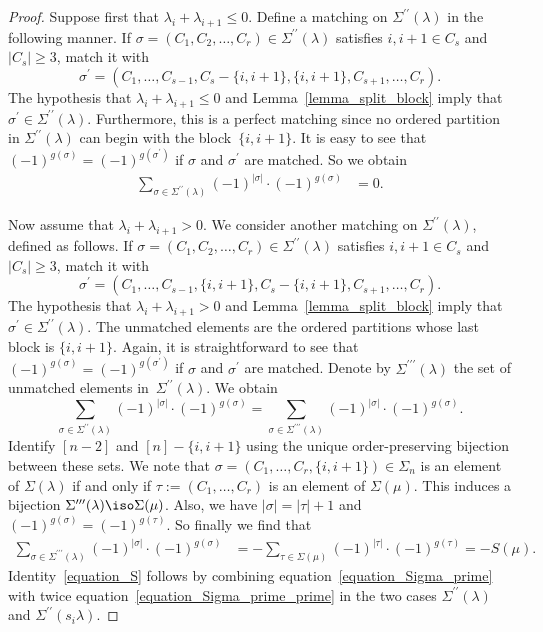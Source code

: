 \begin{proof}
Suppose first that $\lambda_{i}+\lambda_{i+1}\leq 0$.
Define a matching on $\Sigma^{\prime\prime}(\lambda)$ in the following manner.
If $\sigma=(C_{1},C_{2},\ldots,C_{r}) \in \Sigma^{\prime\prime}(\lambda)$
satisfies
$i, i+1 \in C_{s}$ and $|C_{s}|\geq 3$, match it with
$$ \sigma^{\prime}
=
(C_{1},\ldots,C_{s-1},C_{s}-\{i,i+1\},\{i,i+1\},C_{s+1},\ldots,C_{r}) . $$
The hypothesis that $\lambda_{i}+\lambda_{i+1} \leq 0$
and Lemma~\ref{lemma_split_block}
imply that 
$\sigma^{\prime} \in \Sigma^{\prime\prime}(\lambda)$.
Furthermore, this is a perfect matching
since no ordered partition 
in $\Sigma^{\prime\prime}(\lambda)$
can begin with the block~$\{i,i+1\}$.
It is easy to see that 
$(-1)^{g(\sigma)}=(-1)^{g(\sigma^{\prime})}$ if $\sigma$ and $\sigma^{\prime}$ are matched.
So we obtain
\begin{align*}
\sum_{\sigma\in\Sigma^{\prime\prime}(\lambda)}
(-1)^{|\sigma|} \cdot (-1)^{g(\sigma)}
&=0.
\end{align*}


Now assume that $\lambda_{i}+\lambda_{i+1}>0$.
We consider another matching on $\Sigma^{\prime\prime}(\lambda)$, defined as follows.
If $\sigma=(C_{1}, C_{2}, \ldots, C_{r})\in\Sigma^{\prime\prime}(\lambda)$
satisfies $i, i+1 \in C_{s}$ and $|C_{s}| \geq 3$, match it with
$$ \sigma^{\prime}
= 
(C_{1},\ldots,C_{s-1},\{i,i+1\},C_{s}-\{i,i+1\},C_{s+1},\ldots,C_{r}). $$
The hypothesis that $\lambda_{i}+\lambda_{i+1} > 0$
and Lemma~\ref{lemma_split_block}
imply that 
$\sigma^{\prime} \in \Sigma^{\prime\prime}(\lambda)$.
The unmatched elements
are the ordered partitions whose last block is $\{i, i+1\}$.
Again, it is straightforward to see that 
$(-1)^{g(\sigma)}=(-1)^{g(\sigma^{\prime})}$ if $\sigma$ and $\sigma^{\prime}$ are matched.
Denote by $\Sigma^{\prime\prime\prime}(\lambda)$ the set of unmatched elements
in~$\Sigma^{\prime\prime}(\lambda)$.
We obtain
$$ \sum_{\sigma\in\Sigma^{\prime\prime}(\lambda)}
(-1)^{|\sigma|} \cdot (-1)^{g(\sigma)}
=
\sum_{\sigma\in\Sigma^{\prime\prime\prime}(\lambda)}
(-1)^{|\sigma|} \cdot (-1)^{g(\sigma)} . 
$$
Identify
$[n-2]$ and $[n]-\{i,i+1\}$
using the unique order-preserving bijection between these sets.
We note that
$\sigma=(C_{1}, \ldots, C_{r},\{i,i+1\})\in\Sigma_{n}$
is an element of $\Sigma(\lambda)$ if and only if
$\tau := (C_{1},\ldots,C_{r})$ is an element of $\Sigma(\mu)$.
This induces a bijection $\Sigma^{\prime\prime\prime}(\lambda)\iso\Sigma(\mu)$.
Also, we have $|\sigma|=|\tau|+1$ and $(-1)^{g(\sigma)}=(-1)^{g(\tau)}$.
So finally we find that
\begin{align*}
\sum_{\sigma\in\Sigma^{\prime\prime\prime}(\lambda)}
(-1)^{|\sigma|} \cdot (-1)^{g(\sigma)}
&=
-
\sum_{\tau\in\Sigma(\mu)}
(-1)^{|\tau|} \cdot (-1)^{g(\tau)}
=
-S(\mu).
\end{align*}
Identity~\eqref{equation_S}
follows by combining equation~\eqref{equation_Sigma_prime} 
with twice equation~\eqref{equation_Sigma_prime_prime}
in the two cases
$\Sigma^{\prime\prime}(\lambda)$ and $\Sigma^{\prime\prime}(s_{i} \lambda)$.



\end{proof}
